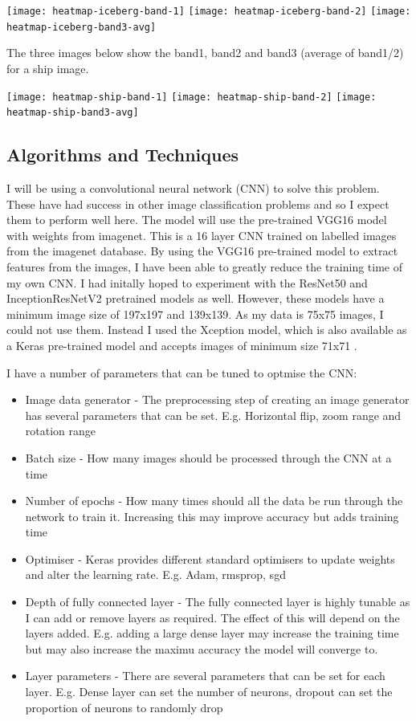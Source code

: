 \documentclass{article}
\begin{document}
\texttt{[image: heatmap-iceberg-band-1]}
\texttt{[image: heatmap-iceberg-band-2]}
\texttt{[image: heatmap-iceberg-band3-avg]}

The three images below show the band1, band2 and band3 (average of band1/2) for a ship image.

\texttt{[image: heatmap-ship-band-1]}
\texttt{[image: heatmap-ship-band-2]}
\texttt{[image: heatmap-ship-band3-avg]}


 
\subsection{Algorithms and Techniques}
I will be using a convolutional neural network (CNN) to solve this problem. These have had success in other image classification problems and so I expect them to perform well here. The model will use the pre-trained VGG16 model with weights from imagenet. This is a 16 layer CNN trained on labelled images from the imagenet database. By using the VGG16 pre-trained model to extract features from the images, I have been able to greatly reduce the training time of my own CNN. I had initally hoped to experiment with the ResNet50 and InceptionResNetV2 pretrained models as well. However, these models have a minimum image size of 197x197 and 139x139. As my data is 75x75 images, I could not use them. Instead I used the Xception model, which is also available as a Keras pre-trained model and accepts images of minimum size 71x71 \cite{keras-layers}. 

I have a number of parameters that can be tuned to optmise the CNN:
\begin{itemize}
\item Image data generator - The preprocessing step of creating an image generator has several parameters that can be set. E.g. Horizontal flip, zoom range and rotation range
\item Batch size - How many images should be processed through the CNN at a time
\item Number of epochs - How many times should all the data be run through the network to train it. Increasing this may improve accuracy but adds training time
\item Optimiser - Keras provides different standard optimisers to update weights and alter the learning rate. E.g. Adam, rmsprop, sgd
\item Depth of fully connected layer - The fully connected layer is highly tunable as I can add or remove layers as required. The effect of this will depend on the layers added. E.g. adding a large dense layer may increase the training time but may also increase the maximu accuracy the model will converge to. 
\item Layer parameters - There are several parameters that can be set for each layer. E.g. Dense layer can set the number of neurons, dropout can set the proportion of neurons to randomly drop
\end{itemize}
\end{document}
